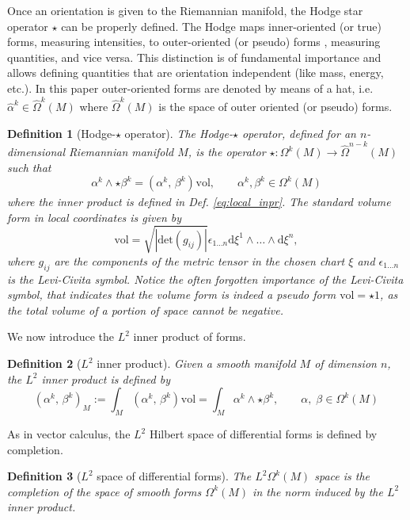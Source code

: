 \documentclass{elsarticle}
\newcommand{\revTwo}[1]{{\color{black}#1}}
\newtheorem{definition}{Definition}
\renewcommand\d{\ensuremath{\mathrm{d}}}
\newcommand*{\dual}[1]{\ensuremath{\widehat{#1}}}
\newcommand{\inpr}[3][]{\ensuremath{( #2, \, #3 )_{#1}}}
\begin{document}
Once an orientation is given to the Riemannian manifold, the Hodge star operator $\star$ can be properly defined. \revTwo{
The Hodge maps inner-oriented (or true) forms, measuring intensities, to outer-oriented (or pseudo) forms \cite{kreeft2011mimetic,frankel2011geometry}, measuring quantities, and vice versa. This distinction is of fundamental importance and allows defining quantities that are orientation independent (like mass, energy, etc.). In this paper outer-oriented forms are denoted by means of a hat, i.e. $\dual{\alpha}^k \in \dual{\Omega}^k(M)$ where $\dual{\Omega}^k(M)$ is the space of outer oriented (or pseudo) forms.
}
\begin{definition}[Hodge-$\star$ operator]
The Hodge-$\star$ operator, defined for an $n$-dimensional Riemannian manifold $M$, is the operator $\star : \Omega^k(M) \rightarrow \dual{\Omega}^{n-k}(M)$ such that
\begin{equation*}
    \alpha^k \wedge {\star \beta^k} = \inpr{\alpha^k}{\beta^k} \mathrm{vol}, \qquad \alpha^k, \beta^k \in \Omega^k(M)
\end{equation*}
where the inner product is defined in Def. \ref{eq:local_inpr}. The standard volume form in local coordinates is given by \cite[Page 362]{frankel2011geometry}
\begin{equation*}
    \mathrm{vol} = \sqrt{|\mathrm{det}(g_{ij})|} \epsilon_{1\dots n}\d\xi^1 \wedge \dots \wedge \d\xi^n,
\end{equation*}
where $g_{ij}$ are the components of the metric tensor in the chosen chart $\xi$ and $\epsilon_{1\dots n}$ is the Levi-Civita symbol. \revTwo{Notice the often forgotten importance of the Levi-Civita symbol, that indicates that the volume form is indeed a pseudo form $\mathrm{vol} = \star 1$, as the total volume of a portion of space cannot be negative.}
\end{definition}


We now introduce the $L^2$ inner product of forms.

\begin{definition}[$L^2$ inner product]
Given a smooth manifold $M$ of dimension $n$, the $L^2$ inner product is defined by
\begin{equation*}
    \inpr[M]{\alpha^k}{\beta^k} := \int_M \inpr{\alpha^k}{\beta^k} \mathrm{vol} = \int_M \alpha^k \wedge {\star \beta^k}, \qquad \alpha, \; \beta \in \Omega^{k}(M)
\end{equation*}
\end{definition}
As in vector calculus, the $L^2$ Hilbert space of differential forms is defined by completion. 
\begin{definition}[$L^2$ space of differential forms]
    The $L^2\Omega^k(M)$ space is the completion of the space of smooth forms $\Omega^k(M)$ in the norm induced by the $L^2$ inner product.
\end{definition}
\end{document}
